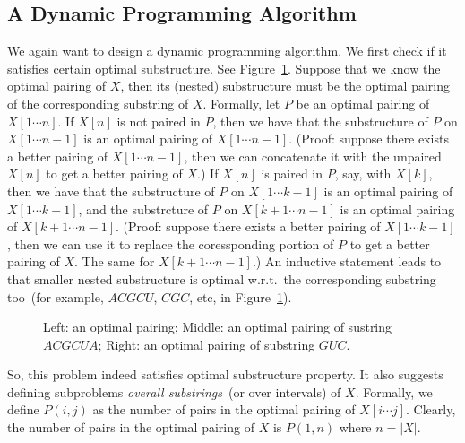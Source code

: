 \subsection*{A Dynamic Programming Algorithm}

We again want to design a dynamic programming algorithm.
We first check if it satisfies certain optimal substructure.
See Figure~\ref{fig:rna-optimal}.
Suppose that we know the optimal pairing of $X$,
then its (nested) substructure must be the optimal
pairing of the corresponding substring of $X$.
Formally, let $P$ be an optimal pairing of $X[1\cdots n]$.
If $X[n]$ is not paired in $P$, then we have that
the substructure of $P$ on $X[1\cdots n - 1]$ is an optimal
pairing of $X[1\cdots n - 1]$. (Proof: suppose there exists
a better pairing of $X[1\cdots n - 1]$, then we can concatenate
it with the unpaired $X[n]$ to get a better pairing of $X$.)
If $X[n]$ is paired in $P$, say, with $X[k]$, then we have that
the substructure of $P$ on $X[1\cdots k - 1]$ is an optimal
pairing of $X[1\cdots k - 1]$, and 
the substrcture of $P$ on $X[k + 1\cdots n - 1]$ is an optimal
pairing of $X[k + 1\cdots n - 1]$. 
(Proof: suppose there exists
a better pairing of $X[1\cdots k - 1]$, then we can use it to replace
the coressponding portion of $P$ to 
get a better pairing of $X$. The same for $X[k + 1\cdots n - 1]$.)
An inductive statement leads to that smaller nested substructure
is optimal w.r.t.\ the corresponding substring too~(for example, 
		$ACGCU$, $CGC$, etc, in Figure~\ref{fig:rna-optimal}).

\begin{figure}[h]
\centering{}
\caption{Left: an optimal pairing; Middle: an optimal pairing of sustring $ACGCUA$; Right: 
an optimal pairing of substring $GUC$.}
\label{fig:rna-optimal}
\end{figure}

So, this problem indeed satisfies optimal substructure property.
It also suggests defining subproblems \emph{overall substrings}~(or over intervals) of $X$.
Formally, we define $P(i,j)$ as the number of pairs in the optimal pairing of $X[i\cdots j]$.
Clearly, the number of pairs in the optimal pairing of $X$ is $P(1,n)$ where $n = |X|$.

